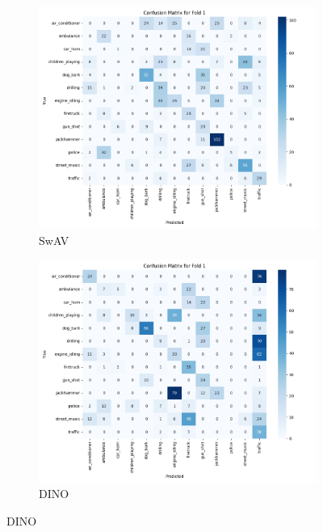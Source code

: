 \documentclass[11pt]{article}
\begin{document}
\begin{figure}[ht]
    \begin{subfigure}[b]{0.24\textwidth}
        \centering
        \includegraphics[width=\textwidth]{latex/assets/1-fold-1-epoch/confusion_matrix_swav.png}
        \caption{SwAV}
        \label{fig:cm_swav}
    \end{subfigure}
    \hfill
    \begin{subfigure}[b]{0.24\textwidth}
        \centering
        \includegraphics[width=\textwidth]{latex/assets/1-fold-1-epoch/confusion_matrix_dino.png}
        \caption{DINO}
        \label{fig:cm_dino}
    \end{subfigure}

\end{figure}
\end{document}
